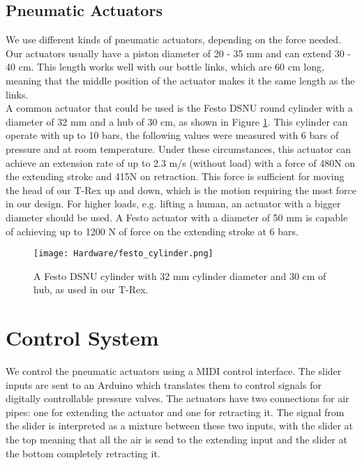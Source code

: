 \subsection{Pneumatic Actuators}
We use different kinds of pneumatic actuators, depending on the force needed. Our actuators usually have a piston diameter of 20 - 35 mm and can extend 30 - 40 cm. This length works well with our bottle links, which are 60 cm long, meaning that the middle position of the actuator makes it the same length as the links.\\
A common actuator that could be used is the Festo DSNU round cylinder with a diameter of 32 mm and a hub of 30 cm, as shown in Figure \ref{fig:festo_cylinder}. This cylinder can operate with up to 10 bars, the following values were measured with 6 bars of pressure and at room temperature. Under these circumstances, this actuator can achieve an extension rate of up to 2.3 m/s (without load) with a force of 480N on the extending stroke and 415N on retraction. This force is sufficient for moving the head of our T-Rex up and down, which is the motion requiring the most force in our design. For higher loads, e.g. lifting a human, an actuator with a bigger diameter should be used. A Festo actuator with a diameter of 50 mm is capable of achieving up to 1200 N of force on the extending stroke at 6 bars.
\begin{figure}[ht!]
    \texttt{[image: Hardware/festo\_cylinder.png]}
    \centering
    \caption{A Festo DSNU cylinder with 32 mm cylinder diameter and 30 cm of hub, as used in our T-Rex.}
    \label{fig:festo_cylinder}
\end{figure}

\section{Control System}
We control the pneumatic actuators using a MIDI control interface. The slider inputs are sent to an Arduino which translates them to control signals for digitally controllable pressure valves. The actuators have two connections for air pipes: one for extending the actuator and one for retracting it. The signal from the slider is interpreted as a mixture between these two inputs, with the slider at the top meaning that all the air is send to the extending input and the slider at the bottom completely retracting it.

